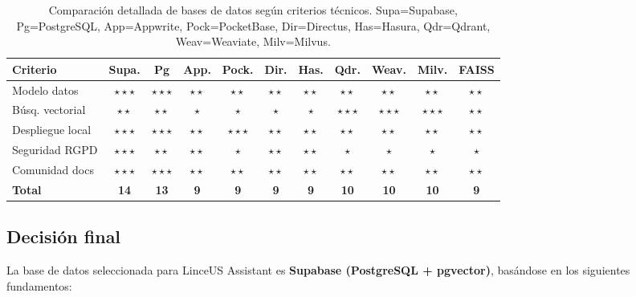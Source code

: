 \begin{table}[h]
\centering
\small
\begin{tabular}{|l|c|c|c|c|c|c|c|c|c|c|}
\hline
\textbf{Criterio} & \textbf{Supa.} & \textbf{Pg} & \textbf{App.} & \textbf{Pock.} & \textbf{Dir.} & \textbf{Has.} & \textbf{Qdr.} & \textbf{Weav.} & \textbf{Milv.} & \textbf{FAISS} \\ \hline
Modelo datos & $\star\star\star$ & $\star\star\star$ & $\star\star$ & $\star\star$ & $\star\star$ & $\star\star$ & $\star\star$ & $\star\star$ & $\star\star$ & $\star\star$ \\ \hline
Búsq. vectorial & $\star\star$ & $\star\star$ & $\star$ & $\star$ & $\star$ & $\star$ & $\star\star\star$ & $\star\star\star$ & $\star\star\star$ & $\star\star$ \\ \hline
Despliegue local & $\star\star\star$ & $\star\star\star$ & $\star\star$ & $\star\star\star$ & $\star\star$ & $\star\star$ & $\star\star$ & $\star\star$ & $\star\star$ & $\star\star$ \\ \hline
Seguridad RGPD & $\star\star\star$ & $\star\star$ & $\star\star$ & $\star$ & $\star\star$ & $\star\star$ & $\star$ & $\star$ & $\star$ & $\star$ \\ \hline
Comunidad docs & $\star\star\star$ & $\star\star\star$ & $\star\star$ & $\star\star$ & $\star\star$ & $\star\star$ & $\star\star$ & $\star\star$ & $\star\star$ & $\star\star$ \\ \hline\hline
\textbf{Total} & \textbf{14} & \textbf{13} & \textbf{9} & \textbf{9} & \textbf{9} & \textbf{9} & \textbf{10} & \textbf{10} & \textbf{10} & \textbf{9} \\ \hline
\end{tabular}
\caption{Comparación detallada de bases de datos según criterios técnicos. Supa=Supabase, Pg=PostgreSQL, App=Appwrite, Pock=PocketBase, Dir=Directus, Has=Hasura, Qdr=Qdrant, Weav=Weaviate, Milv=Milvus.}
\label{tab:comp-bases-datos-detallada}
\end{table}

\subsection{Decisión final}

La base de datos seleccionada para LinceUS Assistant es \textbf{Supabase (PostgreSQL + pgvector)}, basándose en los siguientes fundamentos:

